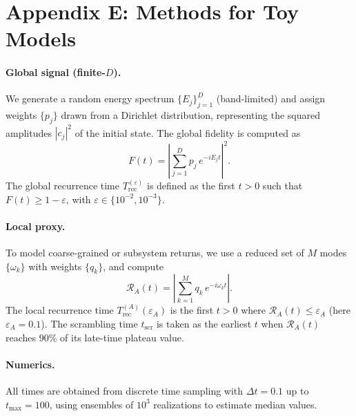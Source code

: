 \documentclass[12pt]{article}
\newcommand{\Trec}{T_{\text{rec}}}
\newcommand{\TrecA}{T^{(A)}_{\text{rec}}}
\newcommand{\tscr}{t_{\text{scr}}}
\theoremstyle{remark}
\begin{document}
\section*{Appendix E: Methods for Toy Models}
\label{app:methods-toys}

\paragraph{Global signal (finite-$D$).}
We generate a random energy spectrum $\{E_j\}_{j=1}^D$ (band-limited) and assign weights $\{p_j\}$ drawn from a Dirichlet distribution, representing the squared amplitudes $|c_j|^2$ of the initial state.
The global fidelity is computed as
\[
F(t) = \left| \sum_{j=1}^D p_j \, e^{-i E_j t} \right|^2 .
\]
The global recurrence time $\Trec^{(\varepsilon)}$ is defined as the first $t>0$ such that $F(t) \geq 1-\varepsilon$, with $\varepsilon \in \{10^{-2}, 10^{-3}\}$.

\paragraph{Local proxy.}
To model coarse-grained or subsystem returns, we use a reduced set of $M$ modes $\{\omega_k\}$ with weights $\{q_k\}$, and compute
\[
\mathcal{R}_A(t) = \left| \sum_{k=1}^M q_k \, e^{-i \omega_k t} \right| .
\]
The local recurrence time $\TrecA(\varepsilon_A)$ is the first $t>0$ where $\mathcal{R}_A(t) \leq \varepsilon_A$ (here $\varepsilon_A = 0.1$).
The scrambling time $\tscr$ is taken as the earliest $t$ when $\mathcal{R}_A(t)$ reaches $90\%$ of its late-time plateau value.

\paragraph{Numerics.}
All times are obtained from discrete time sampling with $\Delta t = 0.1$ up to $t_{\max} = 100$, using ensembles of $10^3$ realizations to estimate median values.
\end{document}
